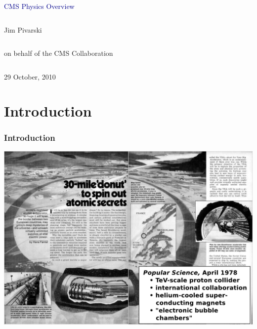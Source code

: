 \documentclass[compress]{beamer}
\begin{document}
\begin{frame}
\vfill
\begin{center}
\textcolor{darkblue}{\Large CMS Physics Overview}

\vfill
\begin{columns}
\begin{center}
\large
Jim Pivarski
\end{center}
\end{columns}

\begin{columns}
\begin{center}
\scriptsize
on behalf of the CMS Collaboration
\end{center}
\end{columns}

\vfill
29 October, 2010

\end{center}
\end{frame}


\small

\section*{Introduction}

\begin{frame}
\frametitle{Introduction}
\includegraphics[width=\linewidth]{popular_mechanics.pdf}
\end{frame}
\end{document}
